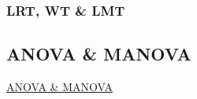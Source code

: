 \documentclass[10pt,
  aspectratio=169,
  serif,
  mathserif,
  professionalfont,
  compress,
  handout,
  ]{beamer}\usepackage[]{graphicx}\usepackage[]{color}
\begin{document}
\begin{frame}
  \frametitle{LRT, WT \& LMT}

\begin{figure} %
\end{figure} %

\end{frame}


\subsection{ANOVA \& MANOVA}


\begin{frame}[c, allowframebreaks]

\begin{center}

  {\normalsize \href{https://lineu96.github.io/st/}{ANOVA \& MANOVA}}
  
\end{center}

\end{frame}

\end{document}
